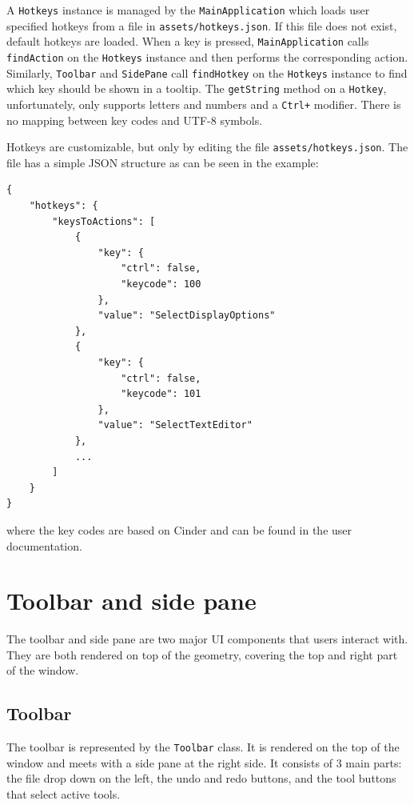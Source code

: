 A \texttt{Hotkeys} instance is managed by the \texttt{MainApplication} which loads user specified hotkeys from a file in \texttt{assets/hotkeys.json}.
If this file does not exist, default hotkeys are loaded.
When a key is pressed, \texttt{MainApplication} calls \texttt{findAction} on the \texttt{Hotkeys} instance and then performs the corresponding action.
Similarly, \texttt{Toolbar} and \texttt{SidePane} call \texttt{findHotkey} on the \texttt{Hotkeys} instance to find which key should be shown in a tooltip.
The \texttt{getString} method on a \texttt{Hotkey}, unfortunately, only supports letters and numbers and a \texttt{Ctrl+} modifier.
There is no mapping between key codes and UTF-8 symbols.

Hotkeys are customizable, but only by editing the file \texttt{assets/hotkeys.json}.
The file has a simple JSON structure as can be seen in the example:

\begin{lstlisting}
{
    "hotkeys": {
        "keysToActions": [
            {
                "key": {
                    "ctrl": false,
                    "keycode": 100
                },
                "value": "SelectDisplayOptions"
            },
            {
                "key": {
                    "ctrl": false,
                    "keycode": 101
                },
                "value": "SelectTextEditor"
            },
            ...
        ]
    }
}
\end{lstlisting}
where the key codes are based on Cinder and can be found in the user documentation.

\section{Toolbar and side pane}

The toolbar and side pane are two major UI components that users interact with.
They are both rendered on top of the geometry, covering the top and right part of the window.

\subsection{Toolbar}

The toolbar is represented by the \texttt{Toolbar} class.
It is rendered on the top of the window and meets with a side pane at the right side.
It consists of 3 main parts: the file drop down on the left, the undo and redo buttons, and the tool buttons that select active tools.

